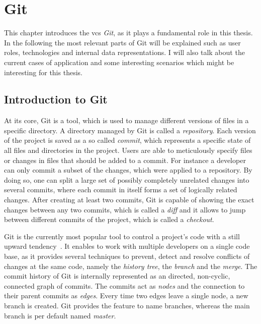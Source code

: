 \section{Git}\label{git-explanation}
This chapter introduces the \ac{vcs} \emph{Git}, as it plays a fundamental role in this thesis.
In the following the most relevant parts of Git will be explained such as user roles, technologies and internal data representations.
I will also talk about the current cases of application and some interesting scenarios which might be interesting for this thesis.


\subsection{Introduction to Git}\label{git-introduction}
At its core, Git is a tool, which is used to manage different versions of files in a specific directory. A directory managed by Git is called a \emph{repository}.
Each version of the project is saved as a so called \emph{commit}, which represents a specific state of all files and directories in the project.
Users are able to meticulously specify files or changes in files that should be added to a commit.
For instance a developer can only commit a subset of the changes, which were applied to a repository.
By doing so, one can split a large set of possibly completely unrelated changes into several commits, where each commit in itself forms a set of logically related changes.
After creating at least two commits, Git is capable of showing the exact changes between any two commits, which is called a \emph{diff} and it allows to jump between different commits of the project, which is called a \emph{checkout}.

Git is the currently most popular tool to control a project's code with a still upward tendency~\cite{article:git-popularity}.
It enables to work with multiple developers on a single code base, as it provides several techniques to prevent, detect and resolve conflicts of changes at the same code, namely the \emph{history tree}, the \emph{branch} and the \emph{merge}.
The commit history of Git is internally represented as an directed, non-cyclic, connected graph of commits.
The commits act as \emph{nodes} and the connection to their parent commits as \emph{edges}.
Every time two edges leave a single node, a new branch is created.
Git provides the feature to name branches, whereas the main branch is per default named \emph{master}.

